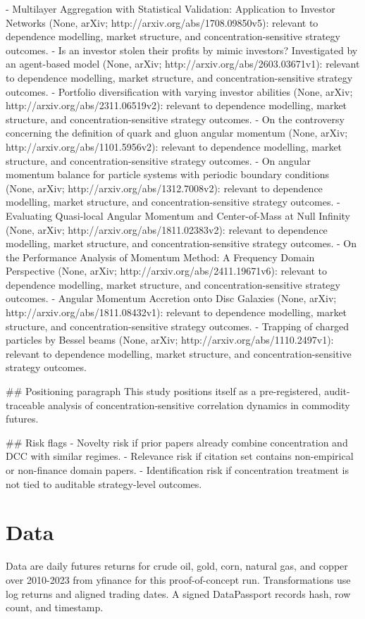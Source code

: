 \documentclass[11pt]{article}
\begin{document}
- Multilayer Aggregation with Statistical Validation: Application to Investor Networks (None, arXiv; http://arxiv.org/abs/1708.09850v5): relevant to dependence modelling, market structure, and concentration-sensitive strategy outcomes.
- Is an investor stolen their profits by mimic investors? Investigated by an agent-based model (None, arXiv; http://arxiv.org/abs/2603.03671v1): relevant to dependence modelling, market structure, and concentration-sensitive strategy outcomes.
- Portfolio diversification with varying investor abilities (None, arXiv; http://arxiv.org/abs/2311.06519v2): relevant to dependence modelling, market structure, and concentration-sensitive strategy outcomes.
- On the controversy concerning the definition of quark and gluon angular momentum (None, arXiv; http://arxiv.org/abs/1101.5956v2): relevant to dependence modelling, market structure, and concentration-sensitive strategy outcomes.
- On angular momentum balance for particle systems with periodic boundary conditions (None, arXiv; http://arxiv.org/abs/1312.7008v2): relevant to dependence modelling, market structure, and concentration-sensitive strategy outcomes.
- Evaluating Quasi-local Angular Momentum and Center-of-Mass at Null Infinity (None, arXiv; http://arxiv.org/abs/1811.02383v2): relevant to dependence modelling, market structure, and concentration-sensitive strategy outcomes.
- On the Performance Analysis of Momentum Method: A Frequency Domain Perspective (None, arXiv; http://arxiv.org/abs/2411.19671v6): relevant to dependence modelling, market structure, and concentration-sensitive strategy outcomes.
- Angular Momentum Accretion onto Disc Galaxies (None, arXiv; http://arxiv.org/abs/1811.08432v1): relevant to dependence modelling, market structure, and concentration-sensitive strategy outcomes.
- Trapping of charged particles by Bessel beams (None, arXiv; http://arxiv.org/abs/1110.2497v1): relevant to dependence modelling, market structure, and concentration-sensitive strategy outcomes.

## Positioning paragraph
This study positions itself as a pre-registered, audit-traceable analysis of concentration-sensitive correlation dynamics in commodity futures.

## Risk flags
- Novelty risk if prior papers already combine concentration and DCC with similar regimes.
- Relevance risk if citation set contains non-empirical or non-finance domain papers.
- Identification risk if concentration treatment is not tied to auditable strategy-level outcomes.


\section{Data}
Data are daily futures returns for crude oil, gold, corn, natural gas, and copper over 2010-2023 from yfinance for this proof-of-concept run. Transformations use log returns and aligned trading dates. A signed DataPassport records hash, row count, and timestamp.
\end{document}
